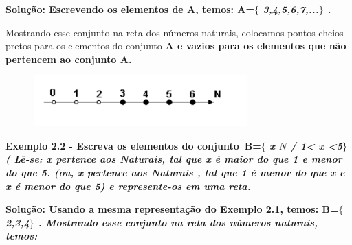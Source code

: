 \documentclass[12pt]{article}
\renewcommand{\_}{\kern-1.5pt\textunderscore\kern-1.5pt}
\begin{document}
\begin{adjustwidth}{0.89in}{0.0in}
\textbf{Solução: Escrevendo os elementos de A, temos: A=$ \{ $ \textit{3,4,5,6,7,...$ \} $ .}}\par

\end{adjustwidth}

\begin{adjustwidth}{0.63in}{0.0in}
Mostrando esse conjunto na reta dos números naturais, colocamos pontos cheios pretos para os elementos do conjunto \textbf{A e vazios para os elementos que não pertencem ao conjunto A.}\par

\end{adjustwidth}




\begin{figure}[H]
	\begin{Center}
		\includegraphics[width=3.26in,height=0.77in]{./media/image3.pdf}
	\end{Center}
\end{figure}



\par

\begin{adjustwidth}{0.63in}{0.0in}
\textbf{Exemplo 2.2 - Escreva os elementos do conjunto\  B=$ \{ $ \textit{x   \( N \)  / 1< x <5$ \} $  ( Lê-se: x pertence aos Naturais, tal que x é maior do que 1 e menor do que 5. (ou, x pertence aos Naturais , tal que 1 é menor do que x e x é menor do que 5) e represente-os em uma reta.}}\par

\end{adjustwidth}

\begin{adjustwidth}{0.63in}{0.0in}
\textbf{Solução: Usando a mesma representação do Exemplo 2.1, temos: B=$ \{ $ \textit{2,3,4$ \} $ . Mostrando esse conjunto na reta dos números naturais, temos:}}\par

\end{adjustwidth}
\end{document}
